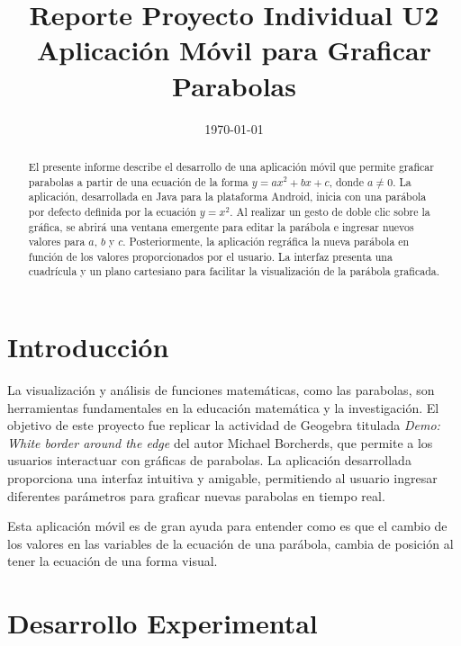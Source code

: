 \documentclass[conference]{IEEEtran}
\date{\specialdate\today}
\begin{document}
\title{Reporte Proyecto Individual U2 \\ Aplicación Móvil para Graficar Parabolas}

\author{
}

\maketitle

\begin{abstract} 
El presente informe describe el desarrollo de una aplicación móvil que permite graficar parabolas a partir de una ecuación de la forma \(y = ax^2 + bx + c\), donde \(a \neq 0\). La aplicación, desarrollada en Java para la plataforma Android, inicia con una parábola por defecto definida por la ecuación \(y = x^2\). Al realizar un gesto de doble clic sobre la gráfica, se abrirá una ventana emergente para editar la parábola e ingresar nuevos valores para \(a\), \(b\) y \(c\). Posteriormente, la aplicación regráfica la nueva parábola en función de los valores proporcionados por el usuario. La interfaz presenta una cuadrícula y un plano cartesiano para facilitar la visualización de la parábola graficada.
\end{abstract}

\section{Introducción}

La visualización y análisis de funciones matemáticas, como las parabolas, son herramientas fundamentales en la educación matemática y la investigación. El objetivo de este proyecto fue replicar la actividad de Geogebra titulada \textit{Demo: White border around the edge} \cite{parabola}  del autor Michael Borcherds, que permite a los usuarios interactuar con gráficas de parabolas. La aplicación desarrollada proporciona una interfaz intuitiva y amigable, permitiendo al usuario ingresar diferentes parámetros para graficar nuevas parabolas en tiempo real.

Esta aplicación móvil es de gran ayuda para entender como es que el cambio de los valores en las variables de la ecuación de una parábola, cambia de posición al tener la ecuación de una forma visual. 

\section{Desarrollo Experimental}
\end{document}
